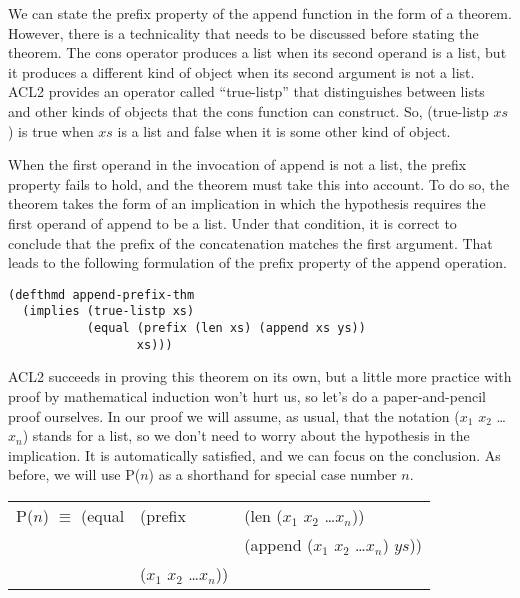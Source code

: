We can state the prefix property of the append function in the form of a theorem. However, there is a technicality that needs to be discussed before stating the theorem. The cons operator produces a list when its second operand is a list, but it produces a different kind of object when its second argument is not a list. ACL2 provides an operator called ``true-listp'' that distinguishes between lists and other kinds of objects that the cons function can construct. So, (true-listp $xs$) is true when $xs$ is a list and false when it is some other kind of object.

When the first operand in the invocation of append is not a list, the prefix property fails to hold, and the theorem must take this into account. To do so, the theorem takes the form of an implication in which the hypothesis requires the first operand of append to be a list. Under that condition, it is correct to conclude that the prefix of the concatenation matches the first argument. That leads to the following formulation of the prefix property of the append operation.

\begin{lstlisting}
(defthmd append-prefix-thm
  (implies (true-listp xs)
           (equal (prefix (len xs) (append xs ys))
                  xs)))
\end{lstlisting}

ACL2 succeeds in proving this theorem on its own, but a little more practice with proof by mathematical induction won't hurt us, so let's do a paper-and-pencil proof ourselves. In our proof we will assume, as usual, that the notation ($x_1$ $x_2$ \dots $x_n$) stands for a list, so we don't need to worry about the hypothesis in the implication. It is automatically satisfied, and we can focus on the conclusion. As before, we will use P($n$) as a shorthand for special case number $n$.

\begin{comment} 
\todo{Rex: Should we replace xs with (x1 x2 ... xn)}
\end{comment}
\begin{center}
\begin{tabular}{lll}
P($n$) $\equiv$ (equal & (prefix & (len ($x_1$ $x_2$ \dots $x_n$))          \\
                       &         & (append ($x_1$ $x_2$ \dots $x_n$) $ys$)) \\
                       & ($x_1$ $x_2$ \dots $x_n$))   &                     \\
\end{tabular}
\end{center}

